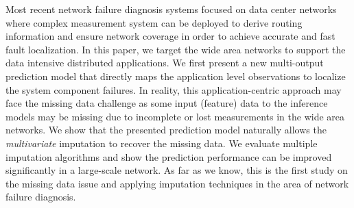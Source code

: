 Most recent network failure diagnosis systems focused on data center networks where 
complex measurement system can be deployed to derive routing information and ensure network coverage 
in order to achieve accurate and fast fault localization. In this paper, we target the wide area networks to 
support the data intensive distributed applications. We first present a new multi-output prediction model 
that directly maps the application level observations to localize the system component failures. 
In reality, this application-centric approach may face the missing data challenge as some input (feature) data 
to the inference models may be missing due to incomplete or lost measurements in the wide area networks. 
We show that the presented prediction model naturally allows the {\it multivariate} imputation to recover the missing data. 
We evaluate multiple imputation algorithms and show the prediction performance can be improved significantly in 
a large-scale network. As far as we know, this is the first study on the missing data issue and applying imputation techniques 
in the area of network failure diagnosis.

